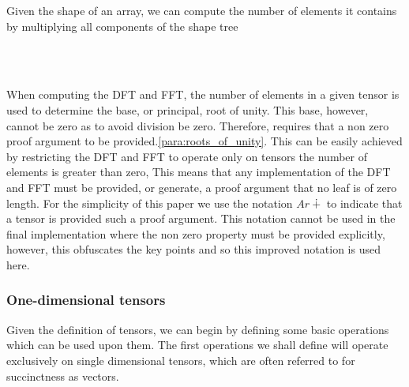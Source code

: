 Given the shape of an array, we can compute the number of elements it contains
by multiplying all components of the shape tree

\begin{code}%
%
\>[2]\AgdaFunction{\#}\AgdaSpace{}%
\AgdaSymbol{:}\AgdaSpace{}%
\AgdaSpace{}%
\AgdaSpace{}%
\<%
\\
%
\>[2]\AgdaFunction{\#}\AgdaSpace{}%
\AgdaSymbol{(}\AgdaSpace{}%
\AgdaSymbol{)}\AgdaSpace{}%
\AgdaSymbol{=}\AgdaSpace{}%
\<%
\\
%
\>[2]\AgdaFunction{\#}\AgdaSpace{}%
\AgdaSymbol{(}\AgdaSpace{}%
\AgdaSpace{}%
\AgdaSymbol{)}\AgdaSpace{}%
\AgdaSymbol{=}\AgdaSpace{}%
\AgdaFunction{\#}\AgdaSpace{}%
\AgdaSpace{}%
\AgdaOperator{\AgdaPrimitive{*}}\AgdaSpace{}%
\AgdaFunction{\#}\AgdaSpace{}%
\<%
\end{code}

When computing the DFT and FFT, the number of elements in a given tensor is used 
to determine the base, or principal, root of unity.
This base, however, cannot be zero as to avoid division be zero.
Therefore,  requires that a non zero proof argument to be provided.\ref{para:roots_of_unity}.
This can be easily achieved by restricting the DFT and FFT to operate only on
tensors the number of elements is greater than zero,
This means that any implementation of the DFT and FFT must be provided, or generate,
a proof argument that no leaf is of zero length.
For the simplicity of this paper we use the notation $Ar∔$ %
to indicate that a tensor is provided such a proof argument.
This notation cannot be used in the final implementation where the non zero property
must be provided explicitly, however, this obfuscates the key points and so this improved
notation is used here.


\subsubsection{One-dimensional tensors}
Given the definition of tensors, we can begin by defining some basic operations 
which can be used upon them.
The first operations we shall define will operate exclusively on single dimensional
tensors, which are often referred to for succinctness as vectors.

